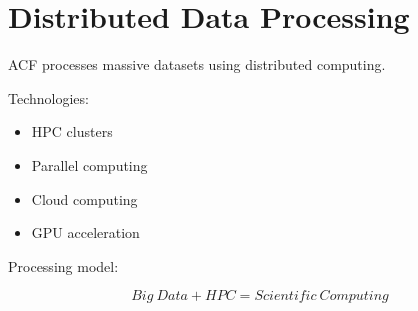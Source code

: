 \section{Distributed Data Processing}


ACF processes massive datasets using distributed computing.



Technologies:


\begin{itemize}

\item HPC clusters

\item Parallel computing

\item Cloud computing

\item GPU acceleration

\end{itemize}



Processing model:


\[
Big\ Data
+
HPC
=
Scientific\ Computing
\]
